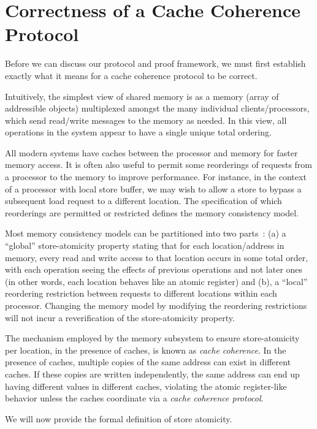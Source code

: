 \section{Correctness of a Cache Coherence Protocol}
\label{Background}

Before we can discuss our protocol and proof framework, we must first establish
exactly what it means for a cache coherence protocol to be correct. 

Intuitively, the simplest view of shared memory is as a memory (array of addressible objects)
multiplexed amongst the many individual clients/processors, which send read/write
messages to the memory as needed. In
this view, all operations in the system appear to have a single unique total
ordering.

All modern systems have caches between the processor and memory for faster
memory access.  It is often also useful to permit some reorderings of requests
from a processor to the memory to improve performance.  For instance, in the
context of a processor with local store buffer, we may wish to allow a store to
bypass a subsequent load request to a different location. The specification of
which reorderings are permitted or restricted defines the memory consistency
model.

Most memory consistency models can be partitioned into two
parts~\cite{Arvind-memory-model}: (a) a ``global'' store-atomicity property
stating that for each location/address in memory, every read and write access
to that location occurs in some total order, with each operation seeing the
effects of previous operations and not later ones (in other words, each
location behaves like an atomic register) and (b), a ``local'' reordering
restriction between requests to different locations within each processor.
Changing the memory model by modifying the reordering restrictions will not
incur a reverification of the store-atomicity property.

The mechanism employed by the memory subsystem to ensure store-atomicity per
location, in the presence of caches, is known as \emph{cache coherence}. In the
presence of caches, multiple copies of the same address can exist in different
caches. If these copies are written independently, the same address can end up
having different values in different caches, violating the atomic register-like
behavior unless the caches coordinate via a \emph{cache coherence protocol}.


We will now provide the formal definition of store atomicity.

